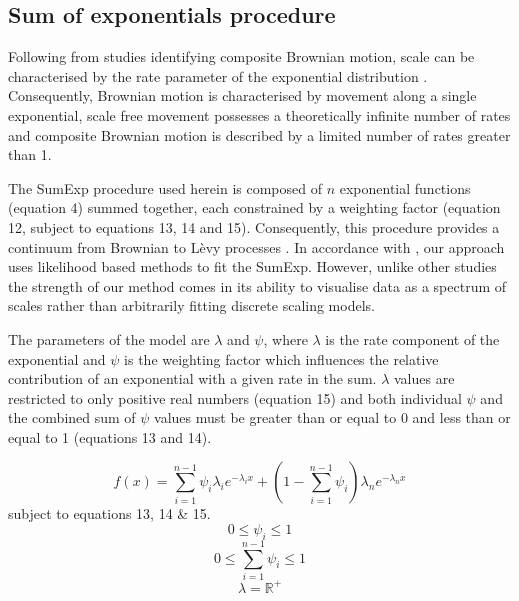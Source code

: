 \documentclass[11pt,usenames,dvipsnames,a4paper]{article}
\begin{document}
\subsection{Sum of exponentials procedure}

\begin{linenumbers}
\hspace{\parindent}
Following from studies identifying composite Brownian motion, scale can be characterised by the rate parameter of the exponential distribution \citep{Petrovskii2011, Jansen2012}. Consequently, Brownian motion is characterised by movement along a single exponential, scale free movement possesses a theoretically infinite number of rates and composite Brownian motion is described by a limited number of rates greater than 1. 

The SumExp procedure used herein is composed of $n$ exponential functions (equation 4) summed together, each constrained by a weighting factor (equation 12, subject to equations 13, 14 and 15). Consequently, this procedure provides a continuum from Brownian to L\`evy processes \citep{Jansen2012}. In accordance with \cite{Murphy2007}, our approach uses likelihood based methods to fit the SumExp. However, unlike other studies \citep{Petrovskii2011, Gautestad2012, Jansen2012, Zhao2016, Sakamoto2017} the strength of our method comes in its ability to visualise data as a spectrum of scales rather than arbitrarily fitting discrete scaling models.

The parameters of the model are $\lambda$ and $\psi$, where $\lambda$ is the rate component of the exponential and $\psi$ is the weighting factor which influences the relative contribution of an exponential with a given rate in the sum. $\lambda$ values are restricted to only positive real numbers (equation 15) and both individual $\psi$ and the combined sum of $\psi$ values must be greater than or equal to 0 and less than or equal to 1 (equations 13 and 14).
\end{linenumbers}

\begin{equation}
f(x) = \sum_{i=1}^{n-1} \psi_i \lambda_i e^{-\lambda_i x} + \left(1 - \sum_{i=1}^{n-1}\psi_i\right) \lambda_n e^{-\lambda_n x}
\end{equation}
subject to equations 13, 14 \& 15.
\begin{equation}
0\leq \psi_i \leq 1
\end{equation}
\begin{equation}
0\leq \sum_{i=1}^{n-1}\psi_i \leq 1
\end{equation}
\begin{equation}
\lambda = \mathbb{R}^+
\end{equation}
\end{document}
